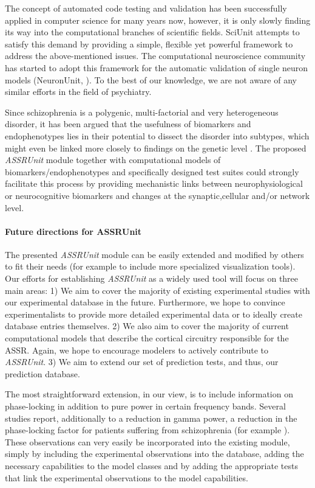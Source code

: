 \documentclass[a4paper,10pt]{article}
\begin{document}
The concept of automated code testing and validation has been successfully applied in computer science for many years now, however, it is only slowly finding its way into the computational 
branches of scientific fields. SciUnit attempts to satisfy this demand by providing a simple, flexible yet powerful framework to address the above-mentioned issues. The computational neuroscience 
community has started to adopt this framework for the automatic validation of single neuron models (NeuronUnit, \cite{Gerkin2014}). 
To the best of our knowledge, we are not aware of any similar efforts in the field of psychiatry.

Since schizophrenia is a polygenic, multi-factorial and very heterogeneous disorder, it has been argued that the usefulness of biomarkers and endophenotypes lies in their potential to
dissect the disorder into subtypes, which might even be linked more closely to findings on the genetic level \cite{Meyer2006,Perlis2011,Markou2009}. The proposed \textit{ASSRUnit} module together with computational models of 
biomarkers/endophenotypes and specifically designed test suites could strongly facilitate this process by providing mechanistic links between neurophysiological or neurocognitive biomarkers
and changes at the synaptic,cellular and/or network level.


\paragraph{Future directions for ASSRUnit}
The presented \textit{ASSRUnit} module can be easily extended and modified by others to fit their needs (for example to include  more specialized visualization tools). Our efforts
for establishing \textit{ASSRUnit} as a widely used tool will focus on three main areas: 1) We aim to cover the majority of existing experimental studies with our experimental database in the future.
Furthermore, we hope to convince experimentalists to provide more detailed experimental data or to
ideally create database entries themselves. 2) We also aim to cover the majority of current computational models that describe the cortical circuitry responsible for the ASSR. 
Again, we hope to encourage modelers to actively contribute to \textit{ASSRUnit}.
3) We aim to extend our set of prediction tests, and thus, our prediction database. 

The most straightforward extension, in our view, is to include information on phase-locking in addition to 
pure power in certain frequency bands. 
Several studies report, additionally to a reduction in gamma power, a  reduction in the phase-locking factor for patients suffering from schizophrenia 
(for example \cite{Kwon1999,Brenner2003,Light2006,Vierling2008,Krishnan2009}). These observations can very easily be incorporated into the existing module, simply by including the experimental observations into the database,
adding the necessary capabilities to the model classes and by adding the appropriate tests that link the experimental observations to the model capabilities.
\end{document}
